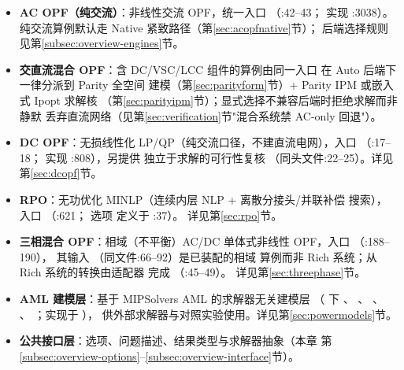 \begin{itemize}
  \item \textbf{AC OPF（纯交流）}：非线性交流 OPF，统一入口
        （:42--43；
        实现 :3038）。
        纯交流算例默认走 Native 紧致路径（第\ref{sec:acopfnative}节）；
        后端选择规则见第\ref{subsec:overview-engines}节。
  \item \textbf{交直流混合 OPF}：含 DC/VSC/LCC 组件的算例由同一入口
         在 Auto 后端下一律分派到 Parity 全空间
        建模（第\ref{sec:parityform}节）+ Parity IPM 或嵌入式 Ipopt 求解核
        （第\ref{sec:parityipm}节）；显式选择不兼容后端时拒绝求解而非静默
        丢弃直流网络（见第\ref{sec:verification}节"混合系统禁 AC-only 回退"）。
  \item \textbf{DC OPF}：无损线性化 LP/QP（纯交流口径，不建直流电网），入口
        （:17--18；
        实现 :808），另提供
        独立于求解的可行性复核 
        （同头文件:22--25）。详见第\ref{sec:dcopf}节。
  \item \textbf{RPO}：无功优化 MINLP（连续内层 NLP + 离散分接头/并联补偿
        搜索），入口 
        （:621；
        选项  定义于
        :37）。
        详见第\ref{sec:rpo}节。
  \item \textbf{三相混合 OPF}：相域（不平衡）AC/DC 单体式非线性 OPF，入口
        （:188--190），
        其输入 （同文件:66--92）是已装配的相域
        算例而非 Rich 系统；从 Rich 系统的转换由适配器
         完成
        （:45--49）。
        详见第\ref{sec:threephase}节。
  \item \textbf{AML 建模层}：基于 MIPSolvers AML 的求解器无关建模层
        （ 下
        、
        、
        、
        、
        ；实现于 ），
        供外部求解器与对照实验使用。详见第\ref{sec:powermodels}节。
  \item \textbf{公共接口层}：选项、问题描述、结果类型与求解器抽象（本章
        第\ref{subsec:overview-options}--\ref{subsec:overview-interface}节）。
\end{itemize}

